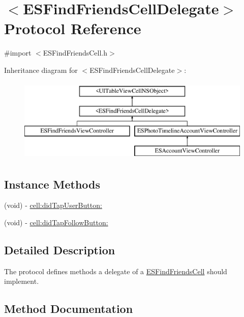 \hypertarget{protocol_e_s_find_friends_cell_delegate-p}{}\section{$<$E\+S\+Find\+Friends\+Cell\+Delegate$>$ Protocol Reference}
\label{protocol_e_s_find_friends_cell_delegate-p}


{\ttfamily \#import $<$E\+S\+Find\+Friends\+Cell.\+h$>$}

Inheritance diagram for $<$E\+S\+Find\+Friends\+Cell\+Delegate$>$\+:\begin{figure}[H]
\begin{center}
\leavevmode
\includegraphics[height=4.000000cm]{protocol_e_s_find_friends_cell_delegate-p}
\end{center}
\end{figure}
\subsection*{Instance Methods}
\begin{DoxyCompactItemize}
\item 
(void) -\/ \hyperlink{protocol_e_s_find_friends_cell_delegate-p_aae137907cf606ad8675123a639360305}{cell\+:did\+Tap\+User\+Button\+:}
\item 
(void) -\/ \hyperlink{protocol_e_s_find_friends_cell_delegate-p_a280e7248a96d6d3ea65d596103ef032f}{cell\+:did\+Tap\+Follow\+Button\+:}
\end{DoxyCompactItemize}


\subsection{Detailed Description}
The protocol defines methods a delegate of a \hyperlink{interface_e_s_find_friends_cell}{E\+S\+Find\+Friends\+Cell} should implement. 

\subsection{Method Documentation}
\hypertarget{protocol_e_s_find_friends_cell_delegate-p_a280e7248a96d6d3ea65d596103ef032f}{}
